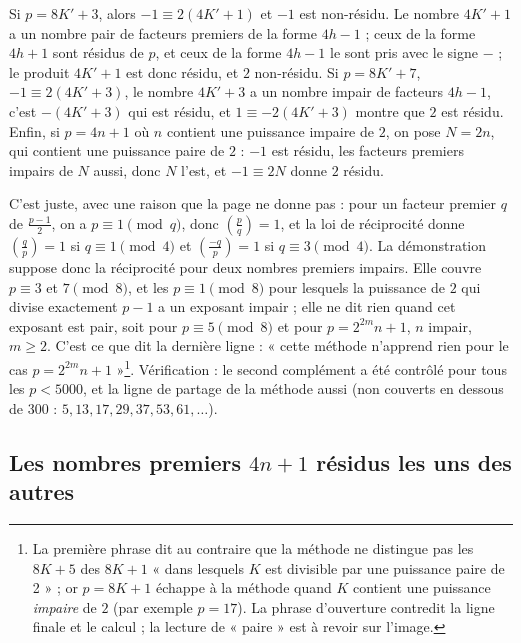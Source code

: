 \documentclass[11pt,a4paper]{article}
\begin{document}
Si $p=8K'+3$, alors $-1\equiv 2(4K'+1)$ et $-1$ est non-résidu. Le nombre $4K'+1$ a un nombre pair de facteurs premiers de la forme $4h-1$ ; ceux de la forme $4h+1$ sont résidus de $p$, et ceux de la forme $4h-1$ le sont pris avec le signe $-$ ; le produit $4K'+1$ est donc résidu, et $2$ non-résidu. Si $p=8K'+7$, $-1\equiv 2(4K'+3)$, le nombre $4K'+3$ a un nombre impair de facteurs $4h-1$, c'est $-(4K'+3)$ qui est résidu, et $1\equiv -2(4K'+3)$ montre que $2$ est résidu. Enfin, si $p=4n+1$ où $n$ contient une puissance impaire de $2$, on pose $N=2n$, qui contient une puissance paire de $2$ : $-1$ est résidu, les facteurs premiers impairs de $N$ aussi, donc $N$ l'est, et $-1\equiv 2N$ donne $2$ résidu.

C'est juste, avec une raison que la page ne donne pas : pour un facteur premier $q$ de $\frac{p-1}{2}$, on a $p\equiv 1\pmod q$, donc $\left(\frac{p}{q}\right)=1$, et la loi de réciprocité donne $\left(\frac{q}{p}\right)=1$ si $q\equiv 1\pmod 4$ et $\left(\frac{-q}{p}\right)=1$ si $q\equiv 3\pmod 4$. La démonstration suppose donc la réciprocité pour deux nombres premiers impairs. Elle couvre $p\equiv 3$ et $7\pmod 8$, et les $p\equiv 1\pmod 8$ pour lesquels la puissance de $2$ qui divise exactement $p-1$ a un exposant impair ; elle ne dit rien quand cet exposant est pair, soit pour $p\equiv 5\pmod 8$ et pour $p=2^{2m}n+1$, $n$ impair, $m\ge2$. C'est ce que dit la dernière ligne : « cette méthode n'apprend rien pour le cas $p=2^{2m}n+1$ »\footnote{La première phrase dit au contraire que la méthode ne distingue pas les $8K+5$ des $8K+1$ « dans lesquels $K$ est divisible par une puissance paire de 2 » ; or $p=8K+1$ échappe à la méthode quand $K$ contient une puissance \emph{impaire} de $2$ (par exemple $p=17$). La phrase d'ouverture contredit la ligne finale et le calcul ; la lecture de « paire » est à revoir sur l'image.}. Vérification : le second complément a été contrôlé pour tous les $p<5000$, et la ligne de partage de la méthode aussi (non couverts en dessous de 300 : $5, 13, 17, 29, 37, 53, 61, \dots$).

\subsection*{Les nombres premiers $4n+1$ résidus les uns des autres}
\end{document}
